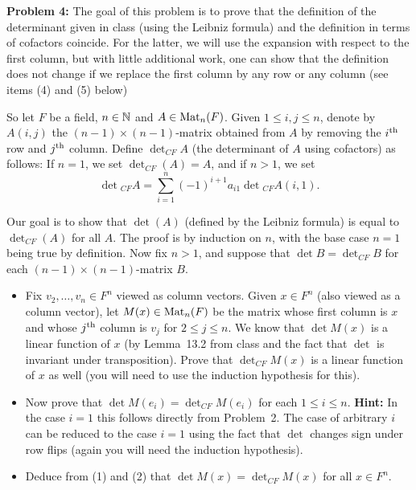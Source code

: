 \documentclass[11pt]{amsart}
\begin{document}
\skv
{\bf Problem 4: } The goal of this problem is to prove that the definition of the determinant given in class (using the Leibniz formula) and the definition in terms of cofactors coincide. For the latter, we will use the expansion with respect to the first column, but with little additional work, one can show that the definition does not change if we replace the first column by any row or any column (see items (4) and (5) below)

So let $F$ be a field, $n\in{\mathbb N}$ and $A\in {\rm Mat}_n(F)$. Given $1\leq i,j\leq n$, denote by $A(i,j)$ the $(n-1)\times (n-1)$-matrix obtained from
$A$ by removing the $i^{\rm th}$ row and $j^{\rm th}$ column. Define $\det_{CF}A $ (the determinant of $A$ using cofactors) as follows:
If $n=1$, we set $\det_{CF}(A)=A$, and if $n>1$, we set
$$\det\textstyle_{CF}A =\sum\limits_{i=1}^n (-1)^{i+1}a_{i1}\det\textstyle_{CF}A(i,1).$$

Our goal is to show that $\det(A)$ (defined by the Leibniz formula) is equal to $\det_{CF}(A)$ for all $A$. The proof is by induction on $n$,
with the base case $n=1$ being true by definition. Now fix $n>1$, and suppose that $\det B =\det_{CF} B$ for each $(n-1)\times (n-1)$-matrix $B$.

\begin{itemize}
\item[(1)] Fix $v_2,\ldots, v_n\in F^n$ viewed as column vectors. Given $x\in F^n$ (also viewed as a column vector), let $M(x)\in{\rm Mat}_n(F)$
be the matrix whose first column is $x$ and whose $j^{\rm th}$ column is $v_j$ for $2\leq j\leq n$. We know that $\det M(x)$ is a linear function
of $x$ (by Lemma~13.2 from class and the fact that $\det$ is invariant under transposition). Prove that $\det_{CF} M(x)$ is a linear function of 
$x$ as well (you will need to use the induction hypothesis for this).
\item[(2)] Now prove that $\det M(e_i) =\det_{CF} M(e_i)$ for each $1\leq i\leq n$. {\bf Hint:} In the case $i=1$ this follows directly from
Problem~2. The case of arbitrary $i$ can be reduced to the case $i=1$ using the fact that $\det$ changes sign under row flips (again you will need the induction hypothesis).
\item[(3)] Deduce from (1) and (2) that $\det M(x) =\det_{CF} M(x)$ for all $x\in F^n$.
\end{itemize}
\end{document}
